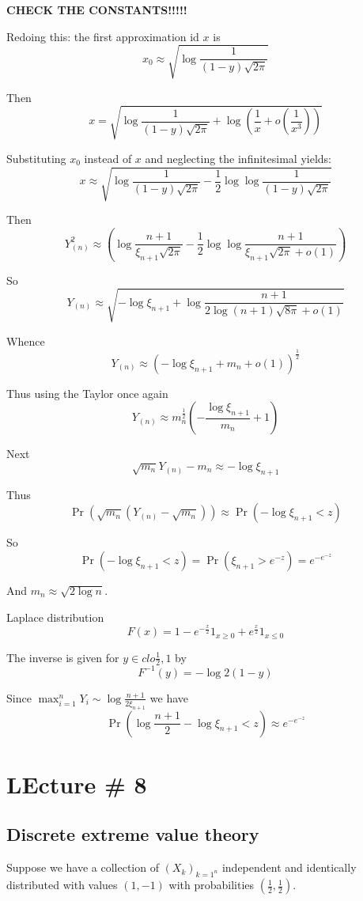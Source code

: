 \documentclass[a4paper]{article}
\newcommand{\brac}[1]{{\left ( #1 \right )}}
\begin{document}
\textbf{CHECK THE CONSTANTS!!!!!}

Redoing this: the first approximation id $x$ is
\[x_0 \approx \sqrt{ \log\frac{1}{(1-y)\sqrt{2\pi}} }\]

Then 
\[x = \sqrt{ \log\frac{1}{(1-y)\sqrt{2\pi}} + \log\brac{ \frac{1}{x} + o(\frac{1}{x^3}) }}\]

Substituting $x_0$ instead of $x$ and neglecting the infinitesimal yields:
\[ x \approx \sqrt{ \log\frac{1}{(1-y)\sqrt{2\pi}} - \frac{1}{2} \log\log\frac{1}{(1-y)\sqrt{2\pi}} }\]

Then 
\[ Y_{(n)}^2 \approx \brac{
\log\frac{n+1}{\xi_{n+1}\sqrt{2\pi}}
- \frac{1}{2} \log\log\frac{n+1}{\xi_{n+1}\sqrt{2\pi} + o(1)}
}\]

So
\[ Y_{(n)} \approx \sqrt{ - \log \xi_{n+1} + \log\frac{n+1}{2\log{(n+1)} \sqrt{8\pi} + o(1) } }\]

Whence
\[ Y_{(n)} \approx \brac{-\log \xi_{n+1} + m_n + o(1) }^\frac{1}{2}\]

Thus using the Taylor once again
\[ Y_{(n)} \approx m_n^\frac{1}{2} \brac{-\frac{\log \xi_{n+1}}{m_n} + 1 }\]

Next 
\[ \sqrt{m_n} Y_{(n)} - m_n\approx - \log \xi_{n+1}\]

Thus
\[ \Pr\brac{\sqrt{m_n} \brac{Y_{(n)} - \sqrt{m_n}}} \approx \Pr\brac{- \log \xi_{n+1} < z }\]

So
\[\Pr\brac{- \log \xi_{n+1} < z } = \Pr\brac{\xi_{n+1} > e^{-z} } = e^{-e^{-z}}\]

And $m_n\approx \sqrt{ 2 \log n}$.


Laplace distribution
\[F(x) = 1-e^{-\frac{x}{2}} 1_{x\geq 0} + e^{\frac{x}{2}} 1_{x\leq 0}\]

The inverse is given for $y\in clo{\frac{1}{2},1}$ by
\[ F^{-1}(y) = - \log 2(1-y)\]

Since $\max_{i=1}^n Y_i \sim \log\frac{n+1}{2\xi_{n+1}}$ 
we have
\[\Pr\brac{ \log\frac{n+1}{2} - \log \xi_{n+1} < z } \approx e^{-e^{-z}}\]



\section{LEcture \# 8} %
\label{sec:lecture_8}

\subsection{Discrete extreme value theory} %
\label{sub:discrete_extreme_value_theory}
Suppose we have a collection of $\brac{X_k}_{k=1^n}$ independent and identically distributed with values $\brac{1, -1}$ with probabilities $\brac{\frac{1}{2},\frac{1}{2}}$.
\end{document}
